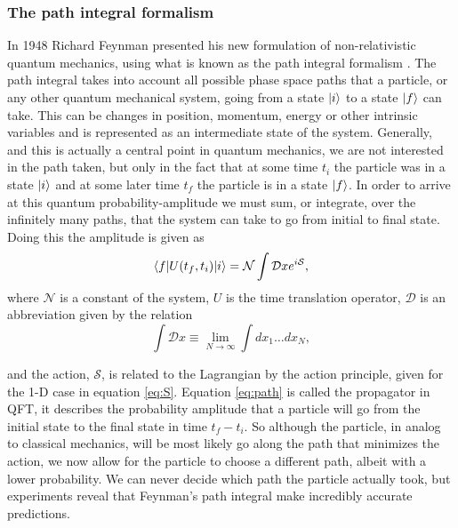 \subsubsection{The path integral formalism} \label{sec:feynpath}
In 1948 Richard Feynman presented his new formulation of non-relativistic quantum mechanics, using what is known as the path integral formalism \cite{feynman1948sta}. The path integral takes into account all possible phase space paths that a particle, or any other quantum mechanical system, going from a state $|i \rangle$ to a state $|f \rangle$ can take. This can be changes in position, momentum, energy or other intrinsic variables and is represented as an intermediate state of the system. Generally, and this is actually a central point in quantum mechanics, we are not interested in the path taken, but only in the fact that at some time $t_{i}$ the particle was in a state $|i \rangle$ and at some later time $t_{f}$ the particle is in a state $|f \rangle$. In order to arrive at this quantum probability-amplitude we must sum, or integrate, over the infinitely many paths, that the system can take to go from initial to final state. Doing this the amplitude is given as \cite{pathinqft}
\begin{equation} \label{eq:path}
	\langle f| U(t_f,t_i) |i \rangle = \mathcal{N} \int \mathcal{D}x e^{i\mathcal{S}},
\end{equation}
where $\mathcal{N}$ is a constant of the system, $U$ is the time translation operator, $\mathcal{D}$ is an abbreviation given by the relation 
\begin{equation}
	\int \mathcal{D} x \equiv \lim_{N \to \infty} \int dx_1 \dots dx_N,
\end{equation}

and the action, $\mathcal{S}$, is related to the Lagrangian by the action principle, given for the 1-D case in equation \ref{eq:S}. Equation \eqref{eq:path} is called the propagator in QFT, it describes the probability amplitude that a particle will go from the initial state to the final state in time $t_f - t_i$. So although the particle, in analog to classical mechanics, will be most likely go along the path that minimizes the action, we now allow for the particle to choose a different path, albeit with a lower probability. We can never decide which path the particle actually took, but experiments reveal that Feynman's path integral make incredibly accurate predictions.

